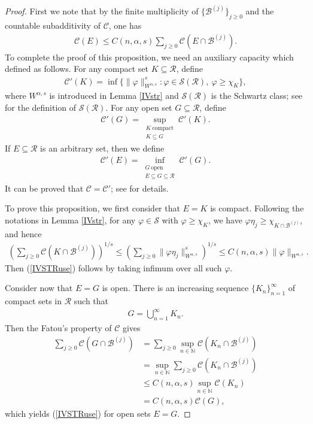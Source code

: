 \documentclass[10pt,reqno]{amsart}
\numberwithin{equation}{section}
\begin{document}
\begin{proof}
First we note that by the finite multiplicity of $\{\mathcal{B}^{(j)}\}_{j\geq 0}$ and the countable subadditivity of $\mathcal{C}$, one has
\begin{align*}
\mathcal{C}(E)\leq C(n,\alpha,s)\sum_{j\geq 0}\mathcal{C}(E\cap\mathcal{B}^{(j)}).
\end{align*}
To complete the proof of this proposition, we need an auxiliary capacity which defined as follows. For any compact set $K\subseteq\mathcal{R}$, define
\begin{align*}
\mathcal{C}'(K)=\inf\{\|\varphi\|_{W^{\alpha,s}}^{s}: \varphi\in\mathcal{S}(\mathcal{R}),~\varphi\geq\chi_{K}\},
\end{align*}
where $W^{\alpha,s}$ is introduced in Lemma \ref{IVstr} and $\mathcal{S}(\mathcal{R})$ is the Schwartz class; see \cite[Definition 2.2.1]{GL} for the definition of $\mathcal{S}(\mathcal{R})$. For any open set $G\subseteq\mathcal{R}$, define
\begin{align*}
\mathcal{C}'(G)=\sup_{\substack{K~\text{compact}\\K\subseteq G}}\mathcal{C}'(K).
\end{align*}
If $E\subseteq\mathcal{R}$ is an arbitrary set, then we define
\begin{align*}
\mathcal{C}'(E)=\inf_{\substack{G~\text{open}\\E\subseteq G\subseteq\mathcal{R}}}\mathcal{C}'(G).
\end{align*}
It can be proved that $\mathcal{C}=\mathcal{C}'$; see \cite[Proposition 2.3.13]{AH} for details.

To prove this proposition, we first consider that $E=K$ is compact. Following the notations in Lemma \ref{IVstr}, for any $\varphi\in\mathcal{S}$ with $\varphi\geq\chi_{K}$, we have $\varphi\eta_{j}\geq\chi_{K\cap\mathcal{B}^{(j)}}$, and hence 
\begin{align*}
\left(\sum_{j\geq 0}\mathcal{C}(K\cap\mathcal{B}^{(j)})\right)^{1/s}\leq\left(\sum_{j\geq 0}\|\varphi\eta_{j}\|_{W^{\alpha,s}}^{s}\right)^{1/s}\leq C(n,\alpha,s)\|\varphi\|_{W^{\alpha,s}}.
\end{align*}
Then (\ref{IVSTRuse}) follows by taking infimum over all such $\varphi$.

Consider now that $E=G$ is open. There is an increasing sequence $\{K_{n}\}_{n=1}^{\infty}$ of compact sets in $\mathcal{R}$ such that 
\begin{align*}
G=\bigcup_{n=1}^{\infty}K_{n}.
\end{align*}
Then the Fatou's property of $\mathcal{C}$ gives
\begin{align*}
\sum_{j\geq 0}\mathcal{C}(G\cap\mathcal{B}^{(j)})&=\sum_{j\geq 0}\sup_{n\in\mathbb{N}}\mathcal{C}(K_{n}\cap\mathcal{B}^{(j)})\\
&=\sup_{n\in\mathbb{N}}\sum_{j\geq 0}\mathcal{C}(K_{n}\cap\mathcal{B}^{(j)})\\
&\leq C(n,\alpha,s)\sup_{n\in\mathbb{N}}\mathcal{C}(K_{n})\\
&=C(n,\alpha,s)\mathcal{C}(G),
\end{align*}
which yields (\ref{IVSTRuse}) for open sets $E=G$.


\end{proof}
\end{document}
